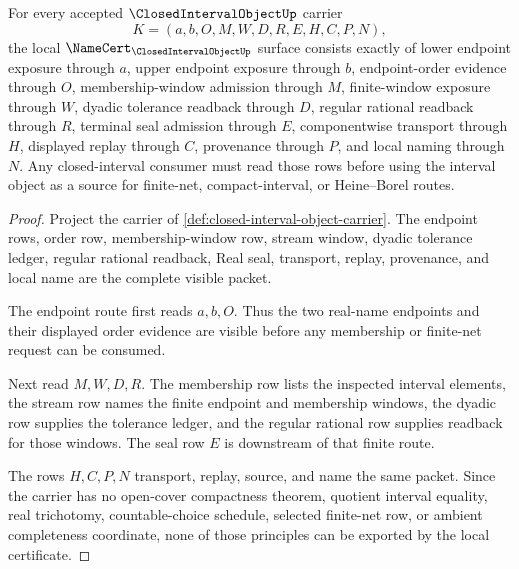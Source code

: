 \begin{theorem}
\label{thm:closed-interval-object-namecert-obligations}
For every accepted $\ClosedIntervalObjectUp$ carrier
$$
K=(a,b,O,M,W,D,R,E,H,C,P,N),
$$
the local $\NameCert_{\ClosedIntervalObjectUp}$ surface consists exactly of lower endpoint exposure through $a$, upper endpoint exposure through $b$, endpoint-order evidence through $O$, membership-window admission through $M$, finite-window exposure through $W$, dyadic tolerance readback through $D$, regular rational readback through $R$, terminal seal admission through $E$, componentwise transport through $H$, displayed replay through $C$, provenance through $P$, and local naming through $N$. Any closed-interval consumer must read those rows before using the interval object as a source for finite-net, compact-interval, or Heine--Borel routes.
\end{theorem}
\begin{proof}
Project the carrier of \autoref{def:closed-interval-object-carrier}. The endpoint rows, order row, membership-window row, stream window, dyadic tolerance ledger, regular rational readback, Real seal, transport, replay, provenance, and local name are the complete visible packet.

The endpoint route first reads $a,b,O$. Thus the two real-name endpoints and their displayed order evidence are visible before any membership or finite-net request can be consumed.

Next read $M,W,D,R$. The membership row lists the inspected interval elements, the stream row names the finite endpoint and membership windows, the dyadic row supplies the tolerance ledger, and the regular rational row supplies readback for those windows. The seal row $E$ is downstream of that finite route.

The rows $H,C,P,N$ transport, replay, source, and name the same packet. Since the carrier has no open-cover compactness theorem, quotient interval equality, real trichotomy, countable-choice schedule, selected finite-net row, or ambient completeness coordinate, none of those principles can be exported by the local certificate.
\end{proof}


